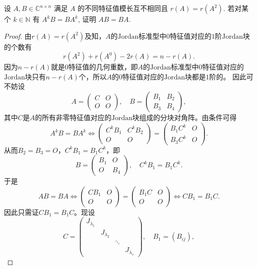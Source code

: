 \documentclass[../../main.tex]{subfiles}%
\begin{document}
\begin{example}
设 \( A,B \in \mathbb{C}^{n \times n} \) 满足 \( A \) 的不同特征值模长互不相同且 \( r(A) = r(A^2) \). 若对某个 \( k \in \mathbb{N} \) 有 \( A^k B = BA^k \), 证明 \( AB = BA \).
\end{example}
\begin{proof}

由$r(A) = r(A^2)$及知，$A$的$\text{Jordan}$标准型中$0$特征值对应的$1$阶$\text{Jordan}$块的个数有
\[
r(A^2) + r(A^0) - 2r(A) = n - r(A).
\]
因为$n - r(A)$就是$0$特征值的几何重数，即$A$的$\text{Jordan}$标准型中$0$特征值对应的$\text{Jordan}$块只有$n - r(A)$个，所以$A$的$0$特征值对应的$\text{Jordan}$块都是$1$阶的。
因此可不妨设
\[
A = \begin{pmatrix}
C & O \\
O & O
\end{pmatrix}, \quad B = \begin{pmatrix}
B_1 & B_2 \\
B_3 & B_4
\end{pmatrix},
\]
其中$C$是$A$的所有非零特征值对应的$\text{Jordan}$块组成的分块对角阵。由条件可得
\[
A^k B = B A^k \Longleftrightarrow \begin{pmatrix}
C^k B_1 & C^k B_2 \\
O & O
\end{pmatrix} = \begin{pmatrix}
B_1 C^k & O \\
B_3 C^k & O
\end{pmatrix}.
\]
从而$B_2 = B_3 = O$，$C^k B_1 = B_1 C^k$，即
\[
B = \begin{pmatrix}
B_1 & O \\
O & B_4
\end{pmatrix}, \quad C^k B_1 = B_1 C^k.
\]
于是
\[
A B = B A \Longleftrightarrow \begin{pmatrix}
C B_1 & O \\
O & O
\end{pmatrix} = \begin{pmatrix}
B_1 C & O \\
O & O
\end{pmatrix} \Longleftrightarrow C B_1 = B_1 C.
\]
因此只需证$C B_1 = B_1 C$。现设
\[
C = \begin{pmatrix}
J_{\lambda_1} & & & \\
& J_{\lambda_2} & & \\
& & \ddots & \\
& & & J_{\lambda_s}
\end{pmatrix}, \quad B_1 = (B_{ij}),
\]
\end{proof}
\end{document}

